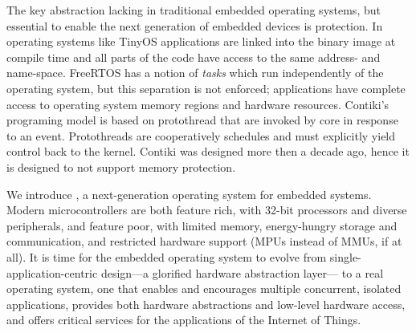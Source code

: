 The key abstraction lacking in traditional embedded operating systems, but
essential to enable the next generation of embedded devices is protection. In
operating systems like TinyOS applications are linked into the
binary image at compile time and all parts of the code have access to the
same address- and name-space. FreeRTOS has a notion of \emph{tasks} which run
independently of the operating system, but this separation is not enforced;
applications have complete access to operating system memory regions and
hardware resources. Contiki's programing model is based on protothread
that are invoked by core in response to an event. Protothreads are cooperatively
schedules and must explicitly yield control back to the kernel. Contiki was
designed more then a decade ago, hence it is designed to not support memory
protection.


We introduce \name, a next-generation operating system for embedded systems.
Modern microcontrollers are both feature rich, with 32-bit processors and
diverse peripherals, and feature poor, with limited memory, energy-hungry
storage and communication, and restricted hardware support (MPUs instead of
MMUs, if at all).
%
It is time for the embedded operating system to evolve from single-application-centric
design---a glorified hardware abstraction layer---%
to a real operating system, %
one that enables and encourages multiple concurrent, isolated applications,
provides both hardware abstractions and low-level hardware access, and offers
critical services for the applications of the Internet of Things.


%

